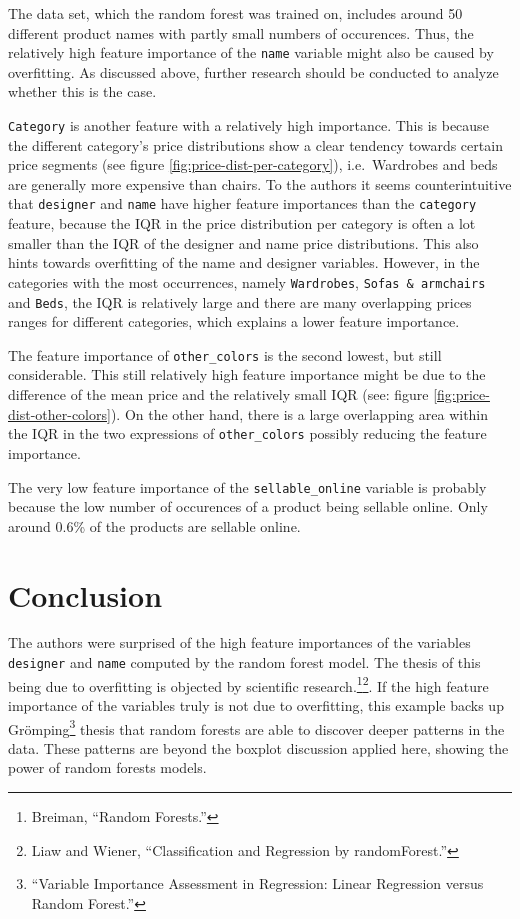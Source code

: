 \documentclass[a4paper, nobind]{templates/ociamthesis}
\begin{document}
The data set, which the random forest was trained on, includes around 50 different product names with partly small numbers of occurences. Thus, the relatively high feature importance of the \texttt{name} variable might also be caused by overfitting. As discussed above, further research should be conducted to analyze whether this is the case.

\texttt{Category} is another feature with a relatively high importance. This is because the different category's price distributions show a clear tendency towards certain price segments (see figure \ref{fig:price-dist-per-category}), i.e.~Wardrobes and beds are generally more expensive than chairs.
To the authors it seems counterintuitive that \texttt{designer} and \texttt{name} have higher feature importances than the \texttt{category} feature, because the IQR in the price distribution per category is often a lot smaller than the IQR of the designer and name price distributions. This also hints towards overfitting of the name and designer variables. However, in the categories with the most occurrences, namely \texttt{Wardrobes}, \texttt{Sofas\ \&\ armchairs} and \texttt{Beds}, the IQR is relatively large and there are many overlapping prices ranges for different categories, which explains a lower feature importance.

The feature importance of \texttt{other\_colors} is the second lowest, but still considerable. This still relatively high feature importance might be due to the difference of the mean price and the relatively small IQR (see: figure \ref{fig:price-dist-other-colors}). On the other hand, there is a large overlapping area within the IQR in the two expressions of \texttt{other\_colors} possibly reducing the feature importance.

The very low feature importance of the \texttt{sellable\_online} variable is probably because the low number of occurences of a product being sellable online. Only around 0.6\% of the products are sellable online.

\hypertarget{conclusion}{%
\section{Conclusion}\label{conclusion}}

The authors were surprised of the high feature importances of the variables \texttt{designer} and \texttt{name} computed by the random forest model. The thesis of this being due to overfitting is objected by scientific research.\footnote{Breiman, ``Random Forests.''}\footnote{Liaw and Wiener, ``Classification and Regression by randomForest.''}. If the high feature importance of the variables truly is not due to overfitting, this example backs up Grömping\footnote{``Variable Importance Assessment in Regression: Linear Regression versus Random Forest.''} thesis that random forests are able to discover deeper patterns in the data. These patterns are beyond the boxplot discussion applied here, showing the power of random forests models.
\end{document}
